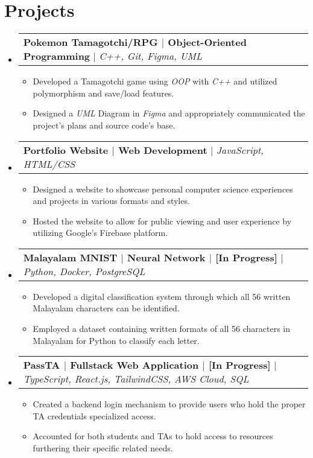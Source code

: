 \documentclass[letterpaper,11pt]{article}
\makeatletter
\newcommand{\resumeItem}[1]{
  \item\small{
    {#1 \vspace{-2pt}}
  }
}
\newcommand{\resumeProjectHeading}[2]{
    \item
    \begin{tabular*}{0.97\textwidth}{l@{\extracolsep{\fill}}r}
      \small#1 & #2 \\
    \end{tabular*}\vspace{-7pt}
}
\newcommand{\resumeSubHeadingListStart}{\begin{itemize}[leftmargin=0.15in, label={}]}
\newcommand{\resumeSubHeadingListEnd}{\end{itemize}}
\newcommand{\resumeItemListStart}{\begin{itemize}}
\newcommand{\resumeItemListEnd}{\end{itemize}\vspace{-5pt}}
\makeatother
\begin{document}
\section{Projects}
    \resumeSubHeadingListStart
    \resumeProjectHeading
          {\textbf{Pokemon Tamagotchi/RPG $|$ Object-Oriented Programming } $|$ \emph{C++, Git, Figma, UML}}{}
          \resumeItemListStart
            \resumeItem{Developed a Tamagotchi game using \textit{OOP} with \textit{C++} and utilized polymorphism and save/load features.}
            \resumeItem{Designed a \textit{UML} Diagram in \textit{Figma} and appropriately communicated the project's plans and source code's base.}
          \resumeItemListEnd

          \resumeProjectHeading
          {\textbf{Portfolio Website $|$ Web Development} $|$ \emph{JavaScript, HTML/CSS}}{}
          \resumeItemListStart
            \resumeItem{Designed a website to showcase personal computer science experiences and projects in various formats and styles.}
            \resumeItem{Hosted the website to allow for public viewing and user experience by utilizing Google's Firebase platform.}
          \resumeItemListEnd
          
      \resumeProjectHeading
          {\textbf{Malayalam MNIST $|$ Neural Network $|$ [In Progress]} $|$ \emph{Python, Docker, PostgreSQL}}{}
          \resumeItemListStart
            \resumeItem{Developed a digital classification system through which all 56 written Malayalam characters can be identified.}
            \resumeItem{Employed a dataset containing written formats of all 56 characters in Malayalam for Python to classify each letter.}
          \resumeItemListEnd

        \resumeProjectHeading
          {\textbf{PassTA $|$ Fullstack Web Application $|$ [In Progress]} $|$ \emph{TypeScript, React.js, TailwindCSS, AWS Cloud, SQL}}{}
          \resumeItemListStart
            \resumeItem{Created a backend login mechanism to provide users who hold the proper TA credentials specialized access.}
            \resumeItem{Accounted for both students and TAs to hold access to resources furthering their specific related needs.}
          \resumeItemListEnd
          
    \resumeSubHeadingListEnd

    
\end{document}
